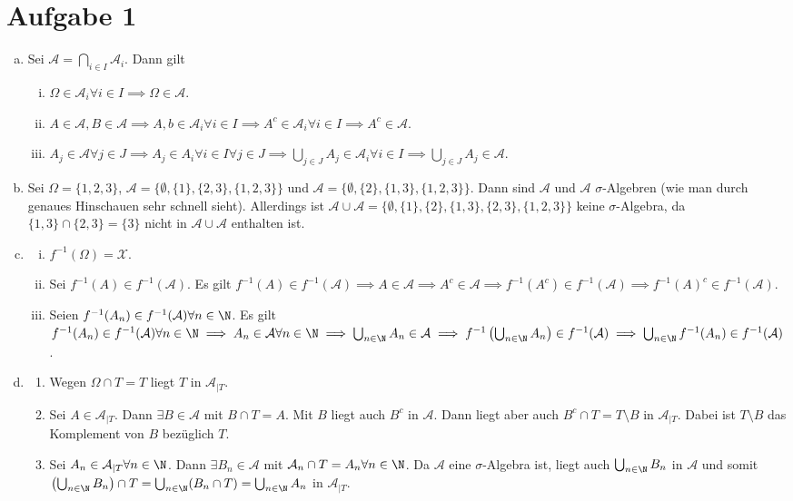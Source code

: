 \documentclass{article}
\newcommand{\A}{\mathcal{A}}
\newcommand{\B}{\mathcal{A}}
\newcommand{\X}{\mathcal{X}}
\begin{document}
\def\headheight{25pt}
    \section*{Aufgabe 1}
    \begin{enumerate}[(a)]
        \item Sei $\A = \bigcap_{i \in I} \A_i$. Dann gilt
        \begin{enumerate}[(i)]
            \item  $\Omega \in \A_i \forall i \in I \implies \Omega \in \A$.
            \item $A\in \A, B\in \A \implies A, b \in \A_i \forall i \in I \implies A^c \in \A_i \forall i\in I \implies A^c \in \A$.
            \item $A_j \in \A \forall j \in J \implies A_j \in A_i \forall i \in I \forall j \in J \implies \bigcup_{j\in J} A_j \in \A_i \forall i \in I \implies \bigcup_{j\in J} A_j \in \A$.
        \end{enumerate}
        \item Sei $\Omega = \{1,2,3\}$, $\A = \{\emptyset, \{1\}, \{2,3\}, \{1,2,3\}\}$ und $\B = \{\emptyset, \{2\}, \{1,3\}, \{1,2,3\}\}$. Dann sind $\A$ und $\B$ $\sigma$-Algebren (wie man durch genaues Hinschauen sehr schnell sieht). Allerdings ist $\A \cup \B = \{\emptyset, \{1\}, \{2\}, \{1,3\}, \{2,3\}, \{1,2,3\}\}$ keine $\sigma$-Algebra, da $\{1,3\}\cap \{2,3\} = \{3\}$ nicht in $\A \cup \B$ enthalten ist.
        \item \begin{enumerate}[(i)]
            \item $f^{-1}(\Omega) = \X$.
            \item Sei $f^{-1}(A) \in f^{-1}(\A)$. Es gilt $f^{-1}(A) \in f^{-1}(\A) \implies A\in \A \implies A^c \in \A \implies f^{-1}(A^c) \in f^{-1}(\A) \implies f^{-1}(A)^c \in f^{-1}(\A)$.
            \item Seien $f^{-1}(A_n) \in f^{-1}(\A) \forall n \in \N$. Es gilt $f^{-1}(A_n) \in f^{-1}(\A) \forall n \in \N \implies A_n \in \A \forall n \in \N \implies \bigcup_{n \in \N} A_n \in \A \implies f^{-1}\left(\bigcup_{n\in \N} A_n\right) \in f^{-1}(\A) \implies \bigcup_{n\in \N} f^{-1}(A_n) \in f^{-1}(\A)$.
        \end{enumerate}
        \item \begin{enumerate}
            \item Wegen $\Omega \cap T = T$ liegt $T$ in $\A_{|T}$.
            \item Sei $A\in \A_{|T}$. Dann $\exists B \in \A$ mit $B \cap T = A$. Mit $B$ liegt auch $B^c$ in $\A$.
            Dann liegt aber auch $B^c \cap T = T \setminus B$ in $\A_{|T}$. Dabei ist $T\setminus B$ das Komplement von $B$ bezüglich $T$.
            \item Sei $A_n \in \A_{|T} \forall n \in \N$. Dann $\exists B_n \in \A$ mit $\B_n \cap T = A_n \forall n \in \N$. Da $\A$ eine $\sigma$-Algebra ist, liegt auch $\bigcup_{n\in \N} B_n$ in $\A$ und somit $\left(\bigcup_{n\in \N} B_n\right) \cap T = \bigcup_{n\in \N} (B_n \cap T) = \bigcup_{n\in \N} A_n$ in $\A_{|T}$. 
        \end{enumerate}
    \end{enumerate}
\end{document}

